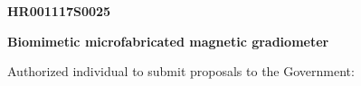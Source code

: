 

\textbf{HR001117S0025}


\textbf{Biomimetic microfabricated magnetic gradiometer}

Authorized individual to submit proposals to the Government:
